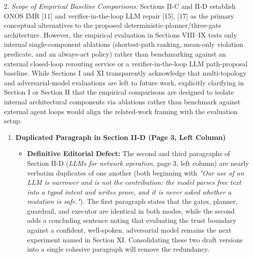 \documentclass[11pt,a4paper]{article}
\begin{document}
2. \emph{Scope of Empirical Baseline Comparisons:} Sections II-C and II-D establish ONOS IMR [11] and verifier-in-the-loop LLM repair [15], [17] as the primary conceptual alternatives to the proposed deterministic-planner/three-gate architecture. However, the empirical evaluation in Sections VIII–IX tests only internal single-component ablations (shortest-path ranking, mean-only violation predicate, and an always-act policy) rather than benchmarking against an external closed-loop rerouting service or a verifier-in-the-loop LLM path-proposal baseline. While Sections I and XI transparently acknowledge that multi-topology and adversarial-model evaluations are left to future work, explicitly clarifying in Section I or Section II that the empirical comparisons are designed to isolate internal architectural components via ablations rather than benchmark against external agent loops would align the related-work framing with the evaluation setup.
\begin{enumerate}[leftmargin=1.6em,itemsep=3pt]
\item \textbf{Duplicated Paragraph in Section II-D (Page 3, Left Column)}
\begin{itemize}[leftmargin=1.8em,itemsep=2pt]
\item \textbf{Definitive Editorial Defect:} The second and third paragraphs of Section II-D (\emph{LLMs for network operation}, page 3, left column) are nearly verbatim duplicates of one another (both beginning with \emph{"Our use of an LLM is narrower and is not the contribution: the model parses free text into a typed intent and writes prose, and it is never asked whether a mutation is safe."}). The first paragraph states that the gates, planner, guardrail, and executor are identical in both modes, while the second adds a concluding sentence noting that evaluating the trust boundary against a confident, well-spoken, adversarial model remains the next experiment named in Section XI. Consolidating these two draft versions into a single cohesive paragraph will remove the redundancy.
\end{itemize}
\end{enumerate}
\end{document}
